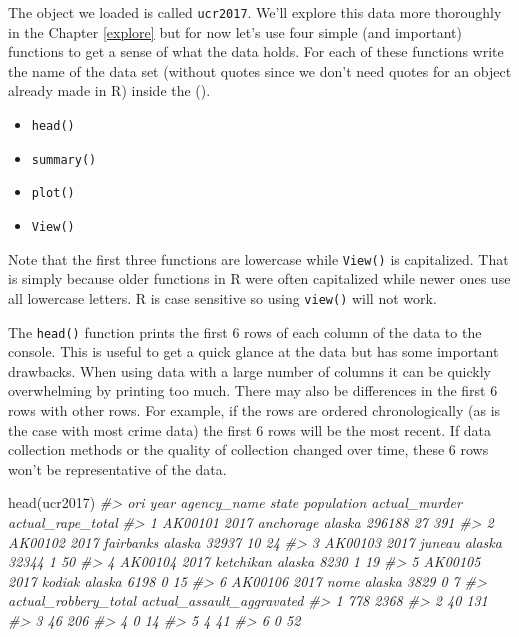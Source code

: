 \documentclass[
  12pt,
]{book}
\newenvironment{Shaded}{\begin{snugshade}}{\end{snugshade}}
\newcommand{\CommentTok}[1]{\textcolor[rgb]{0.37,0.37,0.37}{\textit{#1}}}
\newcommand{\FunctionTok}[1]{\textcolor[rgb]{0,0,0}{#1}}
\newcommand{\NormalTok}[1]{#1}
\providecommand{\tightlist}{%
  \setlength{\itemsep}{0pt}\setlength{\parskip}{0pt}}
\begin{document}
The object we loaded is called \texttt{ucr2017}. We'll explore this data more thoroughly in the Chapter \ref{explore} but for now let's use four simple (and important) functions to get a sense of what the data holds. For each of these functions write the name of the data set (without quotes since we don't need quotes for an object already made in R) inside the ().

\begin{itemize}
\tightlist
\item
  \texttt{head()}
\item
  \texttt{summary()}
\item
  \texttt{plot()}
\item
  \texttt{View()}
\end{itemize}

Note that the first three functions are lowercase while \texttt{View()} is capitalized. That is simply because older functions in R were often capitalized while newer ones use all lowercase letters. R is case sensitive so using \texttt{view()} will not work.

The \texttt{head()} function prints the first 6 rows of each column of the data to the console. This is useful to get a quick glance at the data but has some important drawbacks. When using data with a large number of columns it can be quickly overwhelming by printing too much. There may also be differences in the first 6 rows with other rows. For example, if the rows are ordered chronologically (as is the case with most crime data) the first 6 rows will be the most recent. If data collection methods or the quality of collection changed over time, these 6 rows won't be representative of the data.

\begin{Shaded}
\begin{Highlighting}[]
\FunctionTok{head}\NormalTok{(ucr2017)}
\CommentTok{\#\textgreater{}       ori year agency\_name  state population actual\_murder actual\_rape\_total}
\CommentTok{\#\textgreater{} 1 AK00101 2017   anchorage alaska     296188            27               391}
\CommentTok{\#\textgreater{} 2 AK00102 2017   fairbanks alaska      32937            10                24}
\CommentTok{\#\textgreater{} 3 AK00103 2017      juneau alaska      32344             1                50}
\CommentTok{\#\textgreater{} 4 AK00104 2017   ketchikan alaska       8230             1                19}
\CommentTok{\#\textgreater{} 5 AK00105 2017      kodiak alaska       6198             0                15}
\CommentTok{\#\textgreater{} 6 AK00106 2017        nome alaska       3829             0                 7}
\CommentTok{\#\textgreater{}   actual\_robbery\_total actual\_assault\_aggravated}
\CommentTok{\#\textgreater{} 1                  778                      2368}
\CommentTok{\#\textgreater{} 2                   40                       131}
\CommentTok{\#\textgreater{} 3                   46                       206}
\CommentTok{\#\textgreater{} 4                    0                        14}
\CommentTok{\#\textgreater{} 5                    4                        41}
\CommentTok{\#\textgreater{} 6                    0                        52}
\end{Highlighting}
\end{Shaded}
\end{document}
